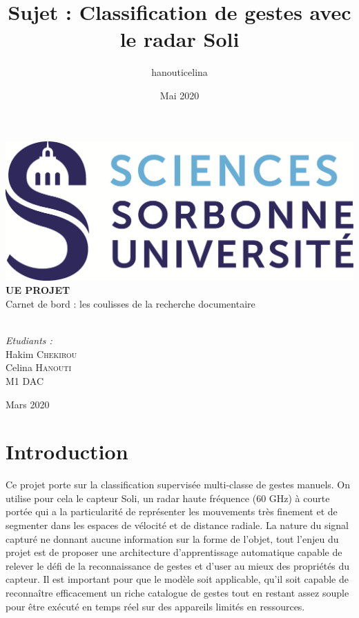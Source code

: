 \documentclass[12pt]{article}
\title{Sujet : Classification de gestes avec le radar Soli}
\author{hanouticelina}
\date{Mai 2020}
\makeatletter
\let\thetitle\@title
\makeatother
\begin{document}
\begin{titlepage}
	\centering
    \vspace{0.7cm}
    \includegraphics[scale = 0.4]{sorbonne.png}\\[2cm]
    \textbf{\LARGE UE PROJET}\\[0.4 cm]
    \Large{Carnet de bord : les coulisses de la recherche documentaire}\\[1 cm]
	
	{\bfseries \thetitle}\\[0.5cm]
	\vspace{2.5cm}
  \begin{minipage}{0.9\textwidth}
      \begin{flushleft} \large
        \emph{Etudiants : }\\
        Hakim \textsc{Chekirou}\\
        Celina \textsc{Hanouti}\\
        M1 DAC
      \end{flushleft}
    \end{minipage}
   
	\vfill
	\vspace{2cm}
   {\large Mars 2020}
\end{titlepage}


\newpage

\section{Introduction}
Ce projet porte sur la classification supervisée multi-classe de gestes manuels. On utilise pour cela le capteur Soli, un radar haute fréquence (60 GHz) à courte portée qui a la particularité de représenter les mouvements très finement et de segmenter dans les espaces de vélocité et de distance radiale. La nature du signal capturé ne donnant aucune information sur la forme de l’objet, tout l’enjeu du projet est de proposer une architecture d’apprentissage automatique capable de relever le défi de la reconnaissance de gestes et d’user au mieux des propriétés du capteur. Il est important pour que le modèle soit applicable, qu’il soit capable de reconnaître efficacement un riche catalogue de gestes tout en restant assez souple pour être exécuté en temps réel sur des appareils limités en ressources. 
\newpage
\end{document}
